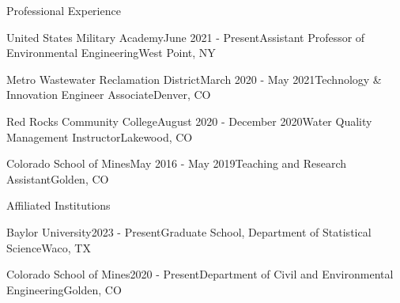 \documentclass{resume} %
\begin{document}

\begin{rSection}{Professional Experience}

\begin{rSubsection}{United States Military Academy}{June 2021 - Present}{Assistant Professor of Environmental Engineering}{West Point, NY}
\end{rSubsection}


\begin{rSubsection}{Metro Wastewater Reclamation District}{March 2020 - May 2021}{Technology \& Innovation Engineer Associate}{Denver, CO}
\end{rSubsection}


\begin{rSubsection}{Red Rocks Community College}{August 2020 - December 2020}{Water Quality Management Instructor}{Lakewood, CO}
\end{rSubsection}


\begin{rSubsection}{Colorado School of Mines}{May 2016 - May 2019}{Teaching and Research Assistant}{Golden, CO}
\end{rSubsection}

%

\begin{rSection}{Affiliated Institutions}

\begin{rSubsection}{Baylor University}{2023 - Present}{Graduate School, Department of Statistical Science}{Waco, TX}
\end{rSubsection}

\begin{rSubsection}{Colorado School of Mines}{2020 - Present}{Department of Civil and Environmental Engineering}{Golden, CO}
\end{rSubsection}

\end{rSection}



\end{rSection}
\end{document}
